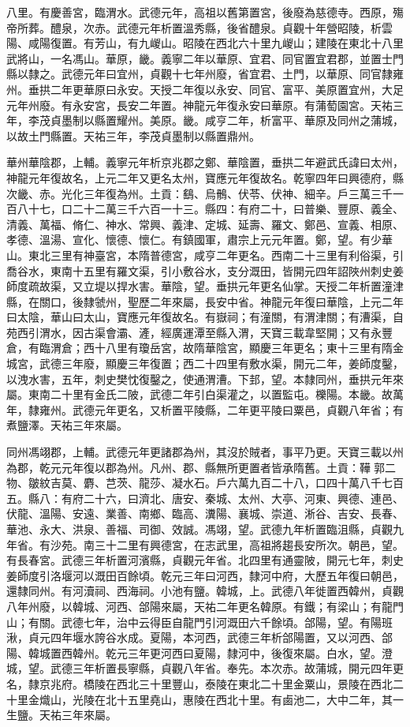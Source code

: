 \begin{pinyinscope}
八里。有慶善宮，臨渭水。武德元年，高祖以舊第置宮，後廢為慈德寺。西原，殤帝所葬。醴泉，次赤。武德元年析置溫秀縣，後省醴泉。貞觀十年營昭陵，析雲陽、咸陽復置。有芳山，有九嵕山。昭陵在西北六十里九嵕山；建陵在東北十八里武將山，一名馮山。華原，畿。義寧二年以華原、宜君、同官置宜君郡，並置士門縣以隸之。武德元年曰宜州，貞觀十七年州廢，省宜君、土門，以華原、同官隸雍州。垂拱二年更華原曰永安。天授二年復以永安、同官、富平、美原置宜州，大足元年州廢。有永安宮，長安二年置。神龍元年復永安曰華原。有蒲萄園宮。天祐三年，李茂貞墨制以縣置耀州。美原。畿。咸亨二年，析富平、華原及同州之蒲城，以故土門縣置。天祐三年，李茂貞墨制以縣置鼎州。



 華州華陰郡，上輔。義寧元年析京兆郡之鄭、華陰置，垂拱二年避武氏諱曰太州，神龍元年復故名，上元二年又更名太州，寶應元年復故名。乾寧四年曰興德府，縣次畿、赤。光化三年復為州。土貢：鷂、烏鶻、伏苓、伏神、細辛。戶三萬三千一百八十七，口二十二萬三千六百一十三。縣四：有府二十，曰普樂、豐原、義全、清義、萬福、脩仁、神水、常興、義津、定城、延壽、羅文、鄭邑、宣義、相原、孝德、溫湯、宣化、懷德、懷仁。有鎮國軍，肅宗上元元年置。鄭，望。有少華山。東北三里有神臺宮，本隋普德宮，咸亨二年更名。西南二十三里有利俗渠，引喬谷水，東南十五里有羅文渠，引小敷谷水，支分溉田，皆開元四年詔陜州刺史姜師度疏故渠，又立堤以捍水害。華陰，望。垂拱元年更名仙掌。天授二年析置潼津縣，在關口，後隸虢州，聖歷二年來屬，長安中省。神龍元年復曰華陰，上元二年曰太陰，華山曰太山，寶應元年復故名。有嶽祠；有潼關，有渭津關；有漕渠，自苑西引渭水，因古渠會灞、滻，經廣運潭至縣入渭，天寶三載韋堅開；又有永豐倉，有臨渭倉；西十八里有瓊岳宮，故隋華陰宮，顯慶三年更名；東十三里有隋金城宮，武德三年廢，顯慶三年復置；西二十四里有敷水渠，開元二年，姜師度鑿，以洩水害，五年，刺史樊忱復鑿之，使通渭漕。下邽，望。本隸同州，垂拱元年來屬。東南二十里有金氏二陂，武德二年引白渠灌之，以置監屯。櫟陽。本畿。故萬年，隸雍州。武德元年更名，又析置平陵縣，二年更平陵曰粟邑，貞觀八年省；有煮鹽澤。天祐三年來屬。



 同州馮翊郡，上輔。武德元年更諸郡為州，其沒於賊者，事平乃更。天寶三載以州為郡，乾元元年復以郡為州。凡州、郡、縣無所更置者皆承隋舊。土貢：鞾郭二物、皺紋吉莫、麝、芑茨、龍莎、凝水石。戶六萬九百二十八，口四十萬八千七百五。縣八：有府二十六，曰濟北、唐安、秦城、太州、大亭、河東、興德、連邑、伏龍、溫陽、安遠、業善、南鄉、臨高、瀵陽、襄城、崇道、淅谷、吉安、長春、華池、永大、洪泉、善福、司御、效誠。馮翊，望。武德九年析置臨沮縣，貞觀九年省。有沙苑。南三十二里有興德宮，在志武里，高祖將趨長安所次。朝邑，望。有長春宮。武德三年析置河濱縣，貞觀元年省。北四里有通靈陂，開元七年，刺史姜師度引洛堰河以溉田百餘頃。乾元三年曰河西，隸河中府，大歷五年復曰朝邑，還隸同州。有河瀆祠、西海祠。小池有鹽。韓城，上。武德八年徙置西韓州，貞觀八年州廢，以韓城、河西、郃陽來屬，天祐二年更名韓原。有鐵；有梁山；有龍門山；有關。武德七年，治中云得臣自龍門引河溉田六千餘頃。郃陽，望。有陽班湫，貞元四年堰水誇谷水成。夏陽，本河西，武德三年析郃陽置，又以河西、郃陽、韓城置西韓州。乾元三年更河西曰夏陽，隸河中，後復來屬。白水，望。澄城，望。武德三年析置長寧縣，貞觀八年省。奉先。本次赤。故蒲城，開元四年更名，隸京兆府。橋陵在西北三十里豐山，泰陵在東北二十里金粟山，景陵在西北二十里金熾山，光陵在北十五里堯山，惠陵在西北十里。有鹵池二，大中二年，其一生鹽。天祐三年來屬。




\end{pinyinscope}
